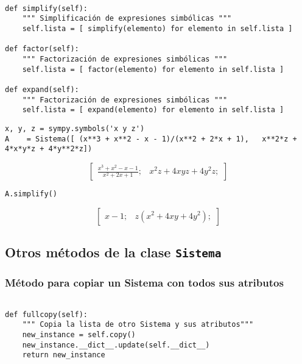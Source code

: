 \documentclass[11pt]{report}
\begin{document}
\begin{verbatim}

def simplify(self):
    """ Simplificación de expresiones simbólicas """
    self.lista = [ simplify(elemento) for elemento in self.lista ]
                                                               
def factor(self):
    """ Factorización de expresiones simbólicas """
    self.lista = [ factor(elemento) for elemento in self.lista ]

def expand(self):
    """ Factorización de expresiones simbólicas """
    self.lista = [ expand(elemento) for elemento in self.lista ]

\end{verbatim}

\begin{verbatim}
x, y, z = sympy.symbols('x y z')
A    = Sistema([ (x**3 + x**2 - x - 1)/(x**2 + 2*x + 1),   x**2*z + 4*x*y*z + 4*y**2*z])
\end{verbatim}

$$\left[ \begin{array}{cc}\frac{x^{3} + x^{2} - x - 1}{x^{2} + 2 x + 1};& x^{2} z + 4 x y z + 4 y^{2} z;\end{array} \right]$$

\begin{verbatim}
A.simplify()
\end{verbatim}

$$\left[ \begin{array}{cc}x - 1;& z \left(x^{2} + 4 x y + 4 y^{2}\right);\end{array} \right]$$

\subsection{Otros métodos de la clase \texttt{Sistema}}
\label{sec:org5dd965b}
\subsubsection{Método para copiar un Sistema con todos sus atributos}
\label{sec:orgc481f27}

\begin{verbatim}

def fullcopy(self):
    """ Copia la lista de otro Sistema y sus atributos"""
    new_instance = self.copy()
    new_instance.__dict__.update(self.__dict__)
    return new_instance

\end{verbatim}
\end{document}
